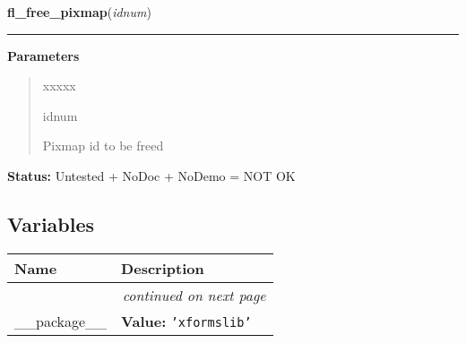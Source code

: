     \label{xformslib:flbitmap:fl_free_pixmap}

    \vspace{0.5ex}

\hspace{.8\funcindent}\begin{boxedminipage}{\funcwidth}

    \raggedright \textbf{fl\_free\_pixmap}(\textit{idnum})

    \vspace{-1.5ex}

    \rule{\textwidth}{0.5\fboxrule}
\setlength{\parskip}{2ex}
\setlength{\parskip}{1ex}
      \textbf{Parameters}
      \vspace{-1ex}

      \begin{quote}
        \begin{Ventry}{xxxxx}

          \item[idnum]

          Pixmap id to be freed

        \end{Ventry}

      \end{quote}

\textbf{Status:} Untested + NoDoc + NoDemo = NOT OK



    \end{boxedminipage}



  \subsection{Variables}

    \vspace{-1cm}
\hspace{\varindent}\begin{longtable}{|p{\varnamewidth}|p{\vardescrwidth}|l}
\cline{1-2}
\cline{1-2} \centering \textbf{Name} & \centering \textbf{Description}& \\
\cline{1-2}
\endhead\cline{1-2}\multicolumn{3}{r}{\small\textit{continued on next page}}\\\endfoot\cline{1-2}
\endlastfoot\raggedright \_\-\_\-p\-a\-c\-k\-a\-g\-e\-\_\-\_\- & \raggedright \textbf{Value:} 
{\tt \texttt{'}\texttt{xformslib}\texttt{'}}&\\
\cline{1-2}
\end{longtable}

